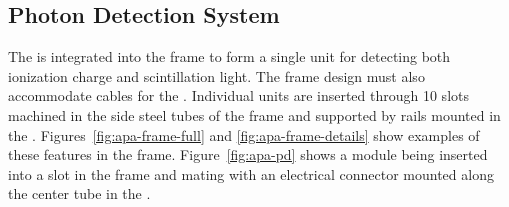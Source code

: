 \subsection{Photon Detection System}
\label{sec:fdsp-apa-intfc-pds}

The  is integrated into the  frame to form a single unit for detecting both ionization charge and scintillation light.  The  frame design must also accommodate cables for the .  
Individual  units are inserted through \num{10} slots machined in the side steel tubes of the frame and supported by rails mounted in the . Figures~\ref{fig:apa-frame-full} and \ref{fig:apa-frame-details} show examples of these features in the frame. Figure~\ref{fig:apa-pd} shows a  module being inserted into a slot in the frame and mating with an electrical connector mounted along the center tube in the .

